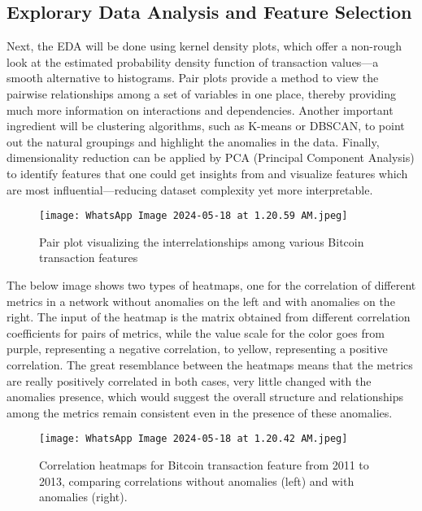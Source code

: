 \documentclass[journal]{IEEEtran}
\begin{document}
\subsection{Explorary Data Analysis and Feature Selection}

Next, the EDA will be done using kernel density plots, which offer a non-rough look at the estimated probability density function of transaction values—a smooth alternative to histograms. Pair plots provide a method to view the pairwise relationships among a set of variables in one place, thereby providing much more information on interactions and dependencies. Another important ingredient will be clustering algorithms, such as K-means or DBSCAN, to point out the natural groupings and highlight the anomalies in the data. Finally, dimensionality reduction can be applied by PCA (Principal Component Analysis) to identify features that one could get insights from and visualize features which are most influential—reducing dataset complexity yet more interpretable.

\begin{figure}[h!]
    \centering
    \texttt{[image: WhatsApp Image 2024-05-18 at 1.20.59 AM.jpeg]}
    \caption{Pair plot visualizing the interrelationships among various Bitcoin transaction features}
    \label{fig:enter-label}
\end{figure}

The below image shows two types of heatmaps, one for the correlation of different metrics in a network without anomalies on the left and with anomalies on the right. The input of the heatmap is the matrix obtained from different correlation coefficients for pairs of metrics, while the value scale for the color goes from purple, representing a negative correlation, to yellow, representing a positive correlation. The great resemblance between the heatmaps means that the metrics are really positively correlated in both cases, very little changed with the anomalies presence, which would suggest the overall structure and relationships among the metrics remain consistent even in the presence of these anomalies.

\begin{figure}[h!]
    \centering
    \texttt{[image: WhatsApp Image 2024-05-18 at 1.20.42 AM.jpeg]}
    \caption{Correlation heatmaps for Bitcoin transaction feature from 2011 to 2013, comparing correlations without anomalies (left) and with anomalies (right).}
    \label{fig:enter-label}
\end{figure}
\end{document}
